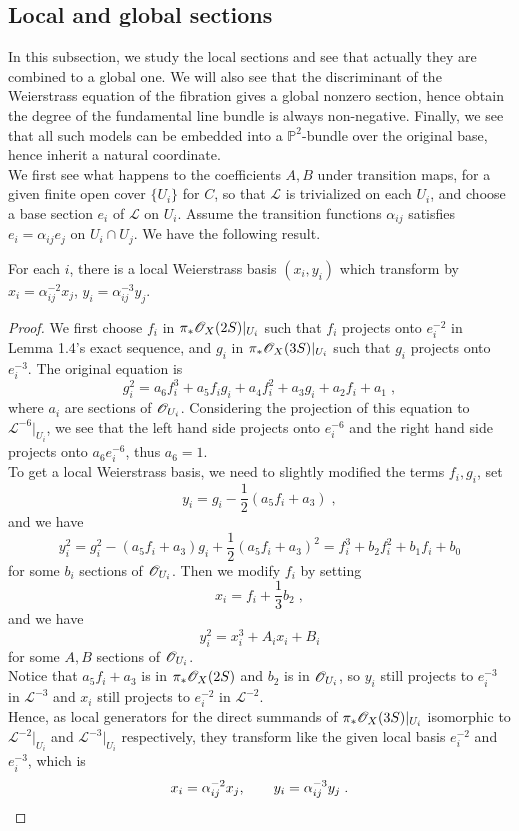 \subsection{Local and global sections}
In this subsection, we study the local sections and see that actually they are combined to a global one. We will also see that the discriminant of the Weierstrass equation of the fibration gives a global nonzero section, hence obtain the degree of the fundamental line bundle is always non-negative. Finally, we see that all such models can be embedded into a $\mathbb{P}^2$-bundle over the original base, hence inherit a natural coordinate.\\ \indent
We first see what happens to the coefficients $A,B$ under transition maps, for a given finite open cover $\{U_i\}$ for $C$, so that $\mathcal{L}$ is trivialized on each $U_i$, and choose a base section $e_i$ of $\mathcal{L}$ on $U_i$. Assume the transition functions $\alpha_{ij}$ satisfies $e_i=\alpha_{ij}e_j$ on $U_i\cap U_j$. We have the following result.
\begin{lemma}
For each $i$, there is a local Weierstrass basis $(x_i,y_i)$ which transform by $x_i=\alpha_{ij}^{-2}x_j$, $y_i=\alpha_{ij}^{-3}y_j$.
\end{lemma}
\begin{proof}
We first choose $f_i$ in $\pi_*\mathscr{O}_X(2S)|_{U_i}$ such that $f_i$ projects onto $e_i^{-2}$ in Lemma 1.4's exact sequence, and $g_i$ in  $\pi_*\mathscr{O}_X(3S)|_{U_i}$ such that $g_i$ projects onto $e_i^{-3}$. The original equation  is
\[ g_i^2=a_6f_i^3+a_5f_ig_i+a_4f_i^2+a_3g_i+a_2f_i+a_1\; , \]
where $a_i$ are sections of $\mathscr{O}_{U_i}$.
Considering the projection of this equation to $\mathcal{L}^{-6}|_{U_i}$, we see that the left hand side projects onto $e_i^{-6}$ and the right hand side projects onto $a_6e_i^{-6}$, thus $a_6=1$.\\ \indent
To get a local Weierstrass basis, we need to slightly modified the terms $f_i,g_i$, set 
\[ y_i=g_i-\frac{1}{2}\left(a_5f_i+a_3\right)\; , \]
and we have
\[ y_i^2=g_i^2-(a_5f_i+a_3)g_i+\frac{1}{2}\left(a_5f_i+a_3\right)^2=f_i^3+b_2f_i^2+b_1f_i+b_0 \]
for some $b_i$ sections of $\mathscr{O}_{U_i}$. Then we modify $f_i$ by setting
\[ x_i=f_i+\frac{1}{3}b_2\; , \]
and we have
\[ y_i^2=x_i^3+A_ix_i+B_i \]
for some $A,B$ sections of $\mathscr{O}_{U_i}$.\\ \indent
Notice that $a_5f_i+a_3$ is in $\pi_*\mathscr{O}_{X}(2S)$ and $b_2$ is in $\mathscr{O}_{U_i}$, so $y_i$ still projects to $e_i^{-3}$ in $\mathcal{L}^{-3}$ and $x_i$ still projects to $e_i^{-2}$ in $\mathcal{L}^{-2}$.\\
\indent Hence, as local generators for the direct summands of $\pi_*\mathscr{O}_X(3S)|_{U_i}$ isomorphic to $\mathcal{L}^{-2}|_{U_i}$ and $\mathcal{L}^{-3}|_{U_i}$ respectively, they transform like the given local basis $e_i^{-2}$ and $e_i^{-3}$, which is
\[ x_i=\alpha_{ij}^{-2}x_j,\qquad y_i=\alpha_{ij}^{-3}y_j\; . \qedhere\]
\end{proof}
